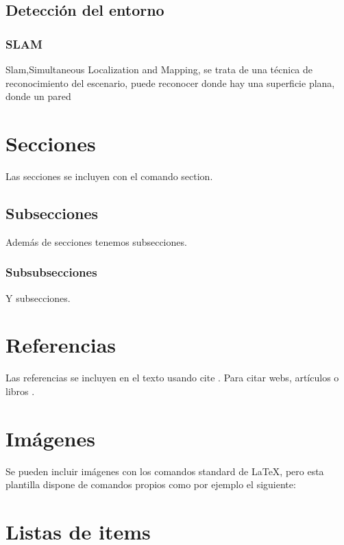 	\subsection{Detección del entorno}
	\subsubsection{SLAM}
	Slam,Simultaneous Localization and Mapping, se trata de una técnica de reconocimiento del escenario, puede reconocer donde hay una superficie plana, donde un pared
	
	
	
\section{Secciones}

Las secciones se incluyen con el comando section.

\subsection{Subsecciones}

Además de secciones tenemos subsecciones.

\subsubsection{Subsubsecciones}

Y subsecciones. 


\section{Referencias}

Las referencias se incluyen en el texto usando cite \cite{wiki:latex}. Para citar webs, artículos o libros \cite{koza92}.


\section{Imágenes}

Se pueden incluir imágenes con los comandos standard de \LaTeX, pero esta plantilla dispone de comandos propios como por ejemplo el siguiente:




\section{Listas de items}

